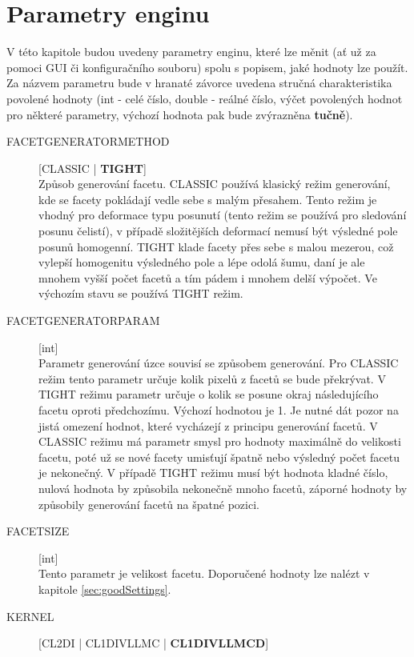\documentclass[a4paper,12pt]{article}
\begin{document}
\section{Parametry enginu}
\label{sec:parameters}
V této kapitole budou uvedeny parametry enginu, které lze měnit (ať už za pomoci GUI či konfiguračního souboru) spolu s popisem, jaké hodnoty lze použít. Za názvem parametru bude v hranaté závorce uvedena stručná charakteristika povolené hodnoty (int - celé číslo, double - reálné číslo, výčet povolených hodnot pro některé parametry, výchozí hodnota pak bude zvýrazněna \textbf{tučně}).
\begin{description}
\item[FACET\textunderscore GENERATOR\textunderscore METHOD] [CLASSIC | \textbf{TIGHT}]\\
Způsob generování facetu. CLASSIC používá klasický režim generování, kde se facety pokládají vedle sebe s malým přesahem. Tento režim je vhodný pro deformace typu posunutí (tento režim se používá pro sledování posunu čelistí), v případě složitějších deformací nemusí být výsledné pole posunů homogenní. TIGHT klade facety přes sebe s malou mezerou, což vylepší homogenitu výsledného pole a lépe odolá šumu, daní je ale mnohem vyšší počet facetů a tím pádem i mnohem delší výpočet. Ve výchozím stavu se používá TIGHT režim.
\item[FACET\textunderscore GENERATOR\textunderscore PARAM] [int]\\
Parametr generování úzce souvisí se způsobem generování. Pro CLASSIC režim tento parametr určuje kolik pixelů z facetů se bude překrývat. V TIGHT režimu parametr určuje o kolik se posune okraj následujícího facetu oproti předchozímu. Výchozí hodnotou je 1. Je nutné dát pozor na jistá omezení hodnot, které vycházejí z principu generování facetů. V CLASSIC režimu má parametr smysl pro hodnoty maximálně do velikosti facetu, poté už se nové facety umisťují špatně nebo výsledný počet facetu je nekonečný. V případě TIGHT režimu musí být hodnota kladné číslo, nulová hodnota by způsobila nekonečně mnoho facetů, záporné hodnoty by způsobily generování facetů na špatné pozici.
\item[FACET\textunderscore SIZE] [int]\\
Tento parametr je velikost facetu. Doporučené hodnoty lze nalézt v kapitole \ref{sec:goodSettings}.
\item[KERNEL] [CL\textunderscore 2D\textunderscore I | CL\textunderscore 1D\textunderscore I\textunderscore V\textunderscore LL\textunderscore MC | \textbf{CL\textunderscore 1D\textunderscore I\textunderscore V\textunderscore LL\textunderscore MC\textunderscore D}]\\

\end{description}
\end{document}
